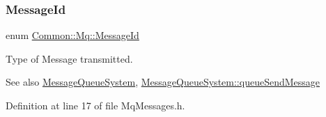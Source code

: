 \subsubsection{\texorpdfstring{Message\+Id}{MessageId}}
{\footnotesize\ttfamily enum \hyperlink{group___common_gaa8c87d2b450282716c906da283e149e6}{Common\+::\+Mq\+::\+Message\+Id}}



Type of Message transmitted. 

\begin{DoxySeeAlso}{See also}
\hyperlink{class_common_1_1_mq_1_1_message_queue_system}{Message\+Queue\+System}, \hyperlink{class_common_1_1_mq_1_1_message_queue_system_ab9a6196ad22221175ec636ea2b08ec5d}{Message\+Queue\+System\+::queue\+Send\+Message} 
\end{DoxySeeAlso}


Definition at line 17 of file Mq\+Messages.\+h.

